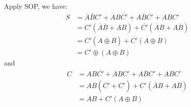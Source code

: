 Apply SOP, we have:
\begin{align*}
    S &= \overline{A}\overline{B}C' + \overline{A}B\overline{C'} + A\overline{B}\overline{C'} + ABC' \\
      &= C'(\overline{A}\overline{B} + AB) + \overline{C'}(\overline{A}B + A\overline{B}) \\
      &= C'(\overline{A\oplus B}) + \overline{C'}(A\oplus B) \\
      &= C'\oplus(A\oplus B)
\end{align*}
and
\begin{align*}
    C &= AB\overline{C'} + \overline{A}BC' + A\overline{B}C' + ABC' \\
      &= AB(\overline{C'} + C') + C' (\overline{A}B + A\overline{B}) \\
      &= AB + C'(A\oplus B)
\end{align*}